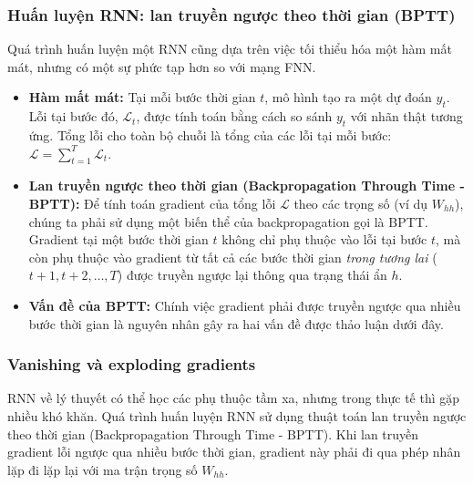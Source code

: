 \subsubsection{Huấn luyện RNN: lan truyền ngược theo thời gian (BPTT)}
\label{sssec:bptt}
Quá trình huấn luyện một RNN cũng dựa trên việc tối thiểu hóa một hàm mất mát, nhưng có một sự phức tạp hơn so với mạng FNN.
\begin{itemize}
    \item \textbf{Hàm mất mát:} Tại mỗi bước thời gian $t$, mô hình tạo ra một dự đoán $y_t$. Lỗi tại bước đó, $\mathcal{L}_t$, được tính toán bằng cách so sánh $y_t$ với nhãn thật tương ứng. Tổng lỗi cho toàn bộ chuỗi là tổng của các lỗi tại mỗi bước: $\mathcal{L} = \sum_{t=1}^{T} \mathcal{L}_t$.
    
    \item \textbf{Lan truyền ngược theo thời gian (Backpropagation Through Time - BPTT):} Để tính toán gradient của tổng lỗi $\mathcal{L}$ theo các trọng số (ví dụ $W_{hh}$), chúng ta phải sử dụng một biến thể của backpropagation gọi là BPTT. Gradient tại một bước thời gian $t$ không chỉ phụ thuộc vào lỗi tại bước $t$, mà còn phụ thuộc vào gradient từ tất cả các bước thời gian \textit{trong tương lai} ($t+1, t+2, \dots, T$) được truyền ngược lại thông qua trạng thái ẩn $h$.
    
    \item \textbf{Vấn đề của BPTT:} Chính việc gradient phải được truyền ngược qua nhiều bước thời gian là nguyên nhân gây ra hai vấn đề được thảo luận dưới đây.
\end{itemize}

\subsubsection{Vanishing và exploding gradients}
RNN về lý thuyết có thể học các phụ thuộc tầm xa, nhưng trong thực tế thì gặp nhiều khó khăn. Quá trình huấn luyện RNN sử dụng thuật toán lan truyền ngược theo thời gian (Backpropagation Through Time - BPTT). Khi lan truyền gradient lỗi ngược qua nhiều bước thời gian, gradient này phải đi qua phép nhân lặp đi lặp lại với ma trận trọng số $W_{hh}$.

